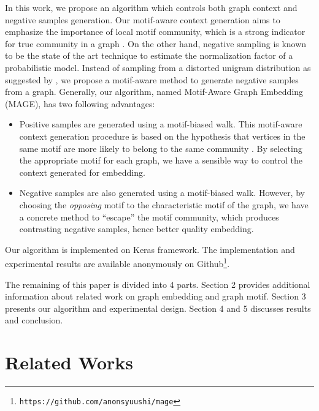 \documentclass[letterpaper]{article}
\begin{document}
        In this work, we propose an algorithm which controls both graph context and negative samples
        generation. Our motif-aware context generation aims to emphasize the importance of local
        motif community, which is a strong indicator for true community in a graph \cite{juremotif}. 
        On the other hand,
        negative sampling is known to be the state of the art technique to estimate the normalization
        factor of a probabilistic model. Instead of sampling from a distorted unigram distribution as
        suggested by \citeauthor{skipgram}, we propose a motif-aware method to generate 
        negative samples from a graph. Generally, our algorithm, named Motif-Aware Graph Embedding (MAGE),
        has two following advantages:

        \begin{itemize}
            \setlength{\parskip}{0pt}
            \item Positive samples are generated using a motif-biased walk. This motif-aware context 
                generation procedure is based on the hypothesis that vertices in the same motif
                are more likely to belong to the same community \cite{juremotif}.
                By selecting the appropriate motif for each graph, we have a sensible way to control
                the context generated for embedding.
            \item Negative samples are also generated using a motif-biased walk. However, by choosing
                the \emph{opposing} motif to the characteristic motif of the graph, we have a concrete
                method to ``escape'' the motif community, which produces contrasting negative
                samples, hence better quality embedding.
        \end{itemize}

        Our algorithm is implemented on Keras \cite{keras} framework. The implementation and experimental
        results are available anonymously on Github\footnote{\texttt{https://github.com/anonsyuushi/mage}}.

        The remaining of this paper is divided into 4 parts. Section 2 provides additional information
        about related work on graph embedding and graph motif. Section 3 presents our algorithm and
        experimental design. Section 4 and 5 discusses results and conclusion.

    \section{Related Works}
\end{document}
